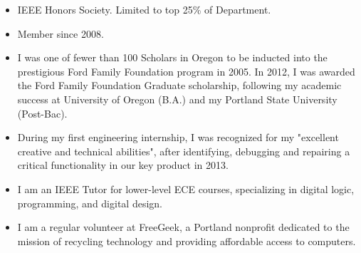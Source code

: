 \documentclass{article}
\begin{document}
	\vspace{-15pt}
	\begin{itemize}
		
		\item {}
		{IEEE Honors Society. Limited to top 25\% of Department.}

		\item {}
		{Member since 2008.}
		\item {}
		{I was one of fewer than 100 Scholars in Oregon to be inducted into the prestigious Ford Family Foundation program in 2005.  In 2012, I was awarded the Ford Family Foundation Graduate scholarship, following my academic success at University of Oregon (B.A.) and my Portland State University (Post-Bac).} 
		
		\item {}
		{During my first engineering internship, I was recognized for my "excellent creative and technical abilities", after identifying, debugging and repairing a critical functionality in our key product in 2013.}
	\end{itemize}

\newpage %

\fancyhf{} %

	\vspace{-15pt}
	\begin{itemize}
	
		\item {}
		{I am an IEEE Tutor for lower-level ECE courses, specializing in digital logic, programming, and digital design.}

		\item {}
		{I am a regular volunteer at FreeGeek, a Portland nonprofit dedicated to the mission of recycling technology and providing affordable access to computers.}

	\end{itemize}
	\vspace*{-2pt}
\end{document}

